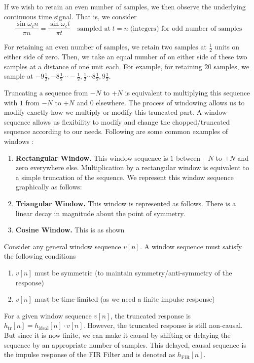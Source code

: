 \documentclass{article}
\theoremstyle{definition}
\newcommand\ddfrac[2]{\frac{\displaystyle #1}{\displaystyle #2}}
\begin{document}
If we wish to retain an even number of samples, we then observe the underlying continuous time signal. That is, we consider 
\[
    \ddfrac{\sin \omega_c n}{\pi n} = \ddfrac{\sin \omega_c t}{\pi t} \quad \text{sampled at} \; t = n \; \text{(integers) for odd number of samples}
\]

For retaining an even number of samples, we retain two samples at $\frac{1}{2}$ units on either side of zero. Then, we take an equal number of on either side of these two samples at a distance of one unit each. For example, for retaining $20$ samples, we sample at $-9 \frac{1}{2} , - 8 \frac{1}{2} \cdots - \frac{1}{2} , \frac{1}{2} \cdots 8 \frac{1}{2} , 9 \frac{1}{2}$. \medskip

Truncating a sequence from $-N$ to $+N$ is equivalent to multiplying this sequence with $1$ from $-N$ to $+N$ and $0$ elsewhere. The process of windowing allows us to modify exactly how we multiply or modify this truncated part. A window sequence allows us flexibility to modify and change the chopped/truncated sequence according to our needs. Following are some common examples of windows :

\begin{enumerate}
    \item \textbf{Rectangular Window.} This window sequence is $1$ between $-N$ to $+N$ and zero everywhere else. Multiplication by a rectangular window is equivalent to a simple truncation of the sequence. We represent this window sequence graphically as follows:
    
    \item \textbf{Triangular Window.} This window is represented as follows. There is a linear decay in magnitude about the point of symmetry. 
    
    \item \textbf{Cosine Window.} This is as shown
\end{enumerate}

Consider any general window sequence $v[n]$. A window sequence must satisfy the following conditions
\begin{enumerate}
    \item $v[n]$ must be symmetric (to maintain symmetry/anti-symmetry of the response)
    \item $v[n]$ must be time-limited (as we need a finite impulse response)
\end{enumerate}

For a given window sequence $v[n]$, the truncated response is $h_{\text{tr}}[n] = h_{\text{ideal}}[n] \cdot v[n]$. However, the truncated response is still non-causal. But since it is now finite, we can make it causal by shifting or delaying the sequence by an appropriate number of samples. This delayed, causal sequence is the impulse response of the FIR Filter and is denoted as $h_{\text{FIR}}[n]$. \medskip
\end{document}
